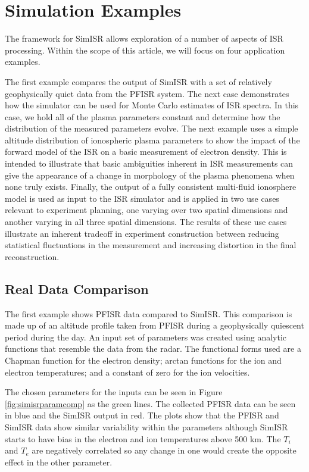 \section{Simulation Examples}
\label{sec:simex}

The framework for SimISR allows exploration of a number of aspects of ISR processing. Within the scope of this article, we will focus on four application examples.

The first example compares the output of SimISR with a set of relatively geophysically quiet data from the PFISR system. The next case demonstrates how the simulator can be used for Monte Carlo estimates of ISR spectra. In this case, we hold all of the plasma parameters constant and determine how the distribution of the measured parameters evolve. The next example uses a simple altitude distribution of ionospheric plasma parameters to show the impact of the forward model of the ISR on a basic measurement of electron density. This is intended to illustrate that basic ambiguities inherent in ISR measurements can give the appearance of a change in morphology of the plasma phenomena when none truly exists. Finally, the output of a fully consistent multi-fluid ionosphere model is used as input to the ISR simulator and is applied in two use cases relevant to experiment planning, one varying over two spatial dimensions and another varying in all three spatial dimensions. The results of these use cases illustrate an inherent tradeoff in experiment construction between reducing statistical fluctuations in the measurement and increasing distortion in the final reconstruction. 

\subsection{Real Data Comparison}

The first example shows PFISR data compared to SimISR. This comparison is made up of an altitude profile taken from PFISR during a geophysically quiescent period during the day. An input set of parameters was created using analytic functions that resemble the data from the radar. The functional forms used are a Chapman function for the electron density; arctan functions for the ion and electron temperatures; and a constant of zero for the ion velocities.

The chosen parameters for the inputs can be seen in Figure \ref{fig:simisrparamcomp} as the green lines. The collected PFISR data can be seen in blue and the SimISR output in red. The plots show that the PFISR and SimISR data show similar variability within the parameters although SimISR starts to have bias in the electron and ion temperatures above 500 km. The $T_i$ and $T_e$ are negatively correlated so any change in one would create the opposite effect in the other parameter.


